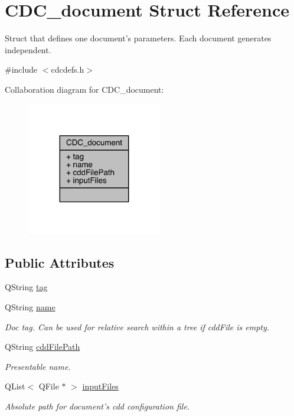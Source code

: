 \hypertarget{struct_c_d_c__document}{\section{C\+D\+C\+\_\+document Struct Reference}
\label{struct_c_d_c__document}
}


Struct that defines one document's parameters. Each document generates independent.  




{\ttfamily \#include $<$cdcdefs.\+h$>$}



Collaboration diagram for C\+D\+C\+\_\+document\+:\nopagebreak
\begin{figure}[H]
\begin{center}
\leavevmode
\includegraphics[width=167pt]{struct_c_d_c__document__coll__graph}
\end{center}
\end{figure}
\subsection*{Public Attributes}
\begin{DoxyCompactItemize}
\item 
Q\+String \hyperlink{struct_c_d_c__document_a99da5d8aeec9a1b01a71cb01101aeffd}{tag}
\item 
Q\+String \hyperlink{struct_c_d_c__document_ad2a1ffe07e12dd635b6f0325633c462c}{name}
\begin{DoxyCompactList}\small\item\em Doc tag. Can be used for relative search within a tree if cdd\+File is empty. \end{DoxyCompactList}\item 
Q\+String \hyperlink{struct_c_d_c__document_a6b9d0b788a21919f9abfe32ea84925cb}{cdd\+File\+Path}
\begin{DoxyCompactList}\small\item\em Presentable name. \end{DoxyCompactList}\item 
Q\+List$<$ Q\+File $\ast$ $>$ \hyperlink{struct_c_d_c__document_a22550856ea998c3102deb2b8075d128e}{input\+Files}
\begin{DoxyCompactList}\small\item\em Absolute path for document's cdd configuration file. \end{DoxyCompactList}\end{DoxyCompactItemize}


